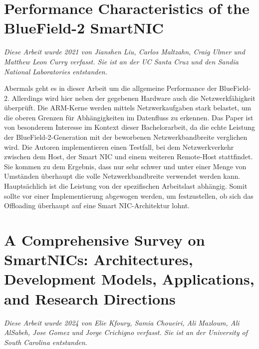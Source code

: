 \section{Performance Characteristics of the BlueField-2 SmartNIC}
\textit{Diese Arbeit wurde 2021 von Jianshen Liu, Carlos Maltzahn, Craig Ulmer und Matthew Leon Curry verfasst. Sie ist an der UC Santa Cruz und den Sandia National Laboratories entstanden.}\cite{liu2021performance}

Abermals geht es in dieser Arbeit um die allgemeine Performance der BlueField-2. Allerdings wird hier neben der gegebenen Hardware auch die Netzwerkfähigkeit überprüft. Die ARM-Kerne werden mittels Netzwerkaufgaben stark belastet, um die oberen Grenzen für Abhängigkeiten im Datenfluss zu erkennen. Das Paper ist von besonderem Interesse im Kontext dieser Bachelorarbeit, da die echte Leistung der BlueField-2-Generation mit der beworbenen Netzwerkbandbreite verglichen wird. Die Autoren implementieren einen Testfall, bei dem Netzwerkverkehr zwischen dem Host, der Smart NIC und einem weiteren Remote-Host stattfindet. Sie kommen zu dem Ergebnis, dass nur sehr schwer und unter einer Menge von Umständen überhaupt die volle Netzwerkbandbreite verwendet werden kann. Hauptsächlich ist die Leistung von der spezifischen Arbeitslast abhängig. Somit sollte vor einer Implementierung abgewogen werden, um festzustellen, ob sich das Offloading überhaupt auf eine Smart NIC-Architektur lohnt.
\section{A Comprehensive Survey on SmartNICs: Architectures, Development Models, Applications, and Research Directions}
\textit{Diese Arbeit wurde 2024 von Elie Kfoury, Samia Choueiri, Ali Mazloum, Ali AlSabeh, Jose Gomez und Jorge Crichigno verfasst. Sie ist an der University of South Carolina entstanden.}\cite{kfoury2024comprehensive}

